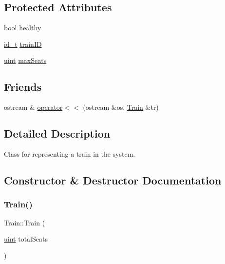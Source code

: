 \subsection*{Protected Attributes}
\begin{DoxyCompactItemize}
\item 
bool \mbox{\hyperlink{classTrain_a46d816dfcfd42a00fb3f20ac0a15e567}{healthy}}
\item 
\mbox{\hyperlink{project__utils_8h_a8f3a969054ad2200720b96e7e23dd4e1}{id\+\_\+t}} \mbox{\hyperlink{classTrain_a8f77f693153f35b33284699d8058bf0a}{train\+ID}}
\item 
\mbox{\hyperlink{project__utils_8h_a91ad9478d81a7aaf2593e8d9c3d06a14}{uint}} \mbox{\hyperlink{classTrain_a2954421b3beb871526ca169beca4c430}{max\+Seats}}
\end{DoxyCompactItemize}
\subsection*{Friends}
\begin{DoxyCompactItemize}
\item 
ostream \& \mbox{\hyperlink{classTrain_a8d9438650288814c061279ef0dc73dcd}{operator$<$$<$}} (ostream \&os, \mbox{\hyperlink{classTrain}{Train}} \&tr)
\end{DoxyCompactItemize}


\subsection{Detailed Description}
Class for representing a train in the system. 

\subsection{Constructor \& Destructor Documentation}
\mbox{\label{classTrain_aa965be5e5d076d2743301c5d75ce4401}} 
\subsubsection{\texorpdfstring{Train()}{Train()}}
{\footnotesize\ttfamily Train\+::\+Train (\begin{DoxyParamCaption}\item[{\mbox{\hyperlink{project__utils_8h_a91ad9478d81a7aaf2593e8d9c3d06a14}{uint}}}]{total\+Seats }\end{DoxyParamCaption})\hspace{0.3cm}{\ttfamily [explicit]}}




